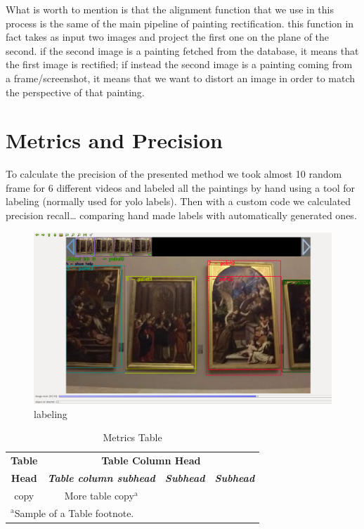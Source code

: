 \documentclass[conference]{IEEEtran}
\begin{document}
What is worth to mention is that the alignment function that we use in this process is the same of the main pipeline of painting rectification. this function in fact takes as input two images and project the first one on the plane of the second. if the second image is a painting fetched from the database, it means that the first image is rectified; if instead the second image is a painting coming from a frame/screenshot, it means that we want to distort an image in order to match the perspective of that painting.



\section{Metrics and Precision}
To calculate the precision of the presented method we took almost 10 random frame for 6 different videos and labeled all the paintings by hand using a tool for labeling (normally used for yolo labels). Then with a custom code we calculated precision recall… comparing hand made labels with automatically generated ones.

\begin{figure}[htbp]
\centerline{\includegraphics[width=0.8\columnwidth]{../Labeling_precision_metrics/Precision_Labeling.png}}
\caption{labeling}
\label{fig_labeling}
\end{figure}


\begin{table}[htbp]
\caption{Metrics Table}
\begin{center}
\begin{tabular}{|c|c|c|c|}
\hline
\textbf{Table}&\multicolumn{3}{|c|}{\textbf{Table Column Head}} \\
\cline{2-4} 
\textbf{Head} & \textbf{\textit{Table column subhead}}& \textbf{\textit{Subhead}}& \textbf{\textit{Subhead}} \\
\hline
copy& More table copy$^{\mathrm{a}}$& &  \\
\hline
\multicolumn{4}{l}{$^{\mathrm{a}}$Sample of a Table footnote.}
\end{tabular}
\label{tab1}
\end{center}
\end{table}
\end{document}
